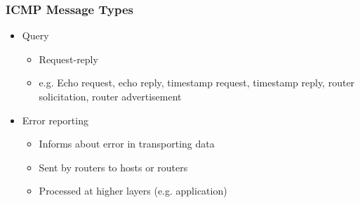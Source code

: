\subsubsection{ICMP Message Types}
\begin{itemize}
	\item Query
	\begin{itemize}
		\item Request-reply
		\item e.g. Echo request, echo reply, timestamp request,
			timestamp reply, router solicitation, router
			advertisement
	\end{itemize}
	\item Error reporting
	\begin{itemize}
		\item Informs about error in transporting data
		\item Sent by routers to hosts or routers
		\item Processed at higher layers (e.g. application)
	\end{itemize}
\end{itemize}
